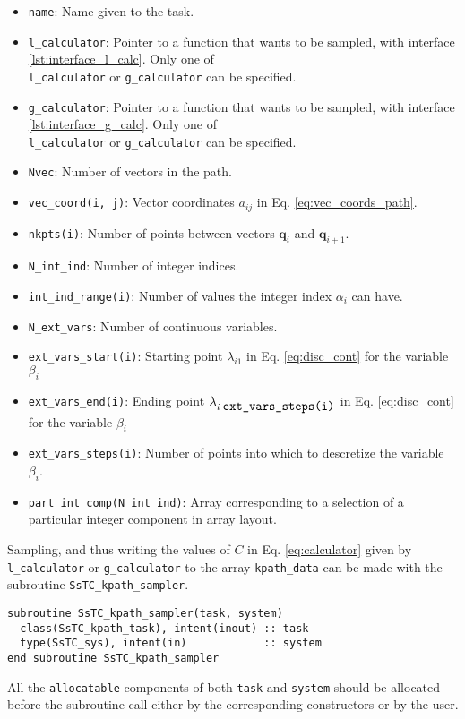 \documentclass[10pt,a4paper]{article}
\begin{document}
\begin{itemize}
\item \verb|name|: Name given to the task.
\item \verb|l_calculator|: Pointer to a function that wants to be sampled, with interface \ref{lst:interface_l_calc}. Only one of \\ \verb|l_calculator| or \verb|g_calculator| can be specified.
\item \verb|g_calculator|: Pointer to a function that wants to be sampled, with interface \ref{lst:interface_g_calc}. Only one of \\ \verb|l_calculator| or \verb|g_calculator| can be specified.
\item \verb|Nvec|: Number of vectors in the path.
\item \verb|vec_coord(i, j)|: Vector coordinates $a_{ij}$ in Eq. \eqref{eq:vec_coords_path}.
\item \verb|nkpts(i)|: Number of points between vectors $\bm{q}_i$ and $\bm{q}_{i+1}$.
\item \verb|N_int_ind|: Number of integer indices.
\item \verb|int_ind_range(i)|: Number of values the integer index $\alpha_i$ can have.
\item \verb|N_ext_vars|: Number of continuous variables.
\item \verb|ext_vars_start(i)|: Starting point $\lambda_{i1}$ in Eq. \eqref{eq:disc_cont} for the variable $\beta_i$
\item \verb|ext_vars_end(i)|: Ending point $\lambda_{i\;\verb|ext_vars_steps(i)|}$ in Eq. \eqref{eq:disc_cont} for the variable $\beta_i$
\item \verb|ext_vars_steps(i)|: Number of points into which to descretize the variable $\beta_i$.
\item \verb|part_int_comp(N_int_ind)|: Array corresponding to a selection of a particular integer component in array layout.
\end{itemize}
Sampling, and thus writing the values of $C$ in Eq. \eqref{eq:calculator} given by \verb|l_calculator| or \verb|g_calculator| to the array \verb|kpath_data| can be made with the subroutine \verb|SsTC_kpath_sampler|.
\begin{lstlisting}[caption={Interface of the ``kpath" sampler.},captionpos=b]
subroutine SsTC_kpath_sampler(task, system)
  class(SsTC_kpath_task), intent(inout) :: task
  type(SsTC_sys), intent(in)            :: system
end subroutine SsTC_kpath_sampler
\end{lstlisting}
All the \verb|allocatable| components of both \verb|task| and \verb|system| should be allocated before the subroutine call either by the corresponding constructors or by the user.
\end{document}
